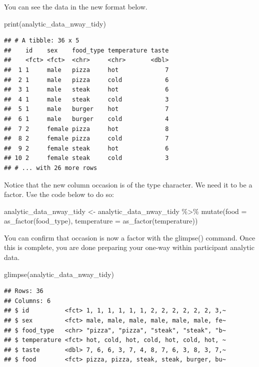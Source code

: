 \documentclass[
]{krantz}
\makeatletter
\newenvironment{Shaded}{\begin{snugshade}}{\end{snugshade}}
\newcommand{\AttributeTok}[1]{\textcolor[rgb]{0.61,0.61,0.61}{#1}}
\newcommand{\FunctionTok}[1]{\textcolor[rgb]{0,0,0}{#1}}
\newcommand{\NormalTok}[1]{#1}
\newcommand{\OtherTok}[1]{\textcolor[rgb]{0.37,0.37,0.37}{#1}}
\newcommand{\SpecialCharTok}[1]{\textcolor[rgb]{0,0,0}{#1}}
\newenvironment{kframe}{%
\medskip{}
\setlength{\fboxsep}{.8em}
 \def\at@end@of@kframe{}%
 \ifinner\ifhmode%
  \def\at@end@of@kframe{\end{minipage}}%
  \begin{minipage}{\columnwidth}%
 \fi\fi%
 \def\FrameCommand##1{\hskip\@totalleftmargin \hskip-\fboxsep
 \colorbox{shadecolor}{##1}\hskip-\fboxsep
     \hskip-\linewidth \hskip-\@totalleftmargin \hskip\columnwidth}%
 \MakeFramed {\advance\hsize-\width
   \@totalleftmargin\z@ \linewidth\hsize
   \@setminipage}}%
 {\par\unskip\endMakeFramed%
 \at@end@of@kframe}
\renewenvironment{Shaded}{\begin{kframe}}{\end{kframe}}
\makeatother
\begin{document}
You can see the data in the new format below.

\begin{Shaded}
\begin{Highlighting}[]
\FunctionTok{print}\NormalTok{(analytic\_data\_nway\_tidy)}
\end{Highlighting}
\end{Shaded}

\begin{verbatim}
## # A tibble: 36 x 5
##    id    sex    food_type temperature taste
##    <fct> <fct>  <chr>     <chr>       <dbl>
##  1 1     male   pizza     hot             7
##  2 1     male   pizza     cold            6
##  3 1     male   steak     hot             6
##  4 1     male   steak     cold            3
##  5 1     male   burger    hot             7
##  6 1     male   burger    cold            4
##  7 2     female pizza     hot             8
##  8 2     female pizza     cold            7
##  9 2     female steak     hot             6
## 10 2     female steak     cold            3
## # ... with 26 more rows
\end{verbatim}

Notice that the new column occasion is of the type character. We need it to be a factor. Use the code below to do so:

\begin{Shaded}
\begin{Highlighting}[]
\NormalTok{analytic\_data\_nway\_tidy }\OtherTok{\textless{}{-}}\NormalTok{ analytic\_data\_nway\_tidy }\SpecialCharTok{\%\textgreater{}\%}
  \FunctionTok{mutate}\NormalTok{(}\AttributeTok{food =} \FunctionTok{as\_factor}\NormalTok{(food\_type),}
         \AttributeTok{temperature =} \FunctionTok{as\_factor}\NormalTok{(temperature))}
\end{Highlighting}
\end{Shaded}

You can confirm that occasion is now a factor with the glimpse() command. Once this is complete, you are done preparing your one-way within participant analytic data.

\begin{Shaded}
\begin{Highlighting}[]
\FunctionTok{glimpse}\NormalTok{(analytic\_data\_nway\_tidy)}
\end{Highlighting}
\end{Shaded}

\begin{verbatim}
## Rows: 36
## Columns: 6
## $ id          <fct> 1, 1, 1, 1, 1, 1, 2, 2, 2, 2, 2, 2, 3,~
## $ sex         <fct> male, male, male, male, male, male, fe~
## $ food_type   <chr> "pizza", "pizza", "steak", "steak", "b~
## $ temperature <fct> hot, cold, hot, cold, hot, cold, hot, ~
## $ taste       <dbl> 7, 6, 6, 3, 7, 4, 8, 7, 6, 3, 8, 3, 7,~
## $ food        <fct> pizza, pizza, steak, steak, burger, bu~
\end{verbatim}
\end{document}
